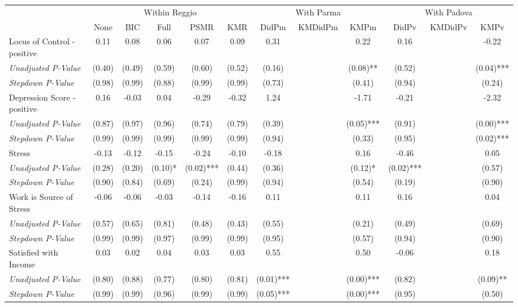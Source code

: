 \begin{tabular}{l c c c c c c c c c c c}
\toprule
& \multicolumn{5}{c}{Within Reggio} & \multicolumn{3}{c}{With Parma} & \multicolumn{3}{c}{With Padova} \\\cmidrule(lr){2-6} \cmidrule(lr){7-9} \cmidrule(lr){10-12}
 & None & BIC & Full & PSMR & KMR & DidPm & KMDidPm & KMPm & DidPv & KMDidPv & KMPv \\
\midrule
Locus of Control - positive & 0.11 & 0.08 & 0.06 & 0.07 & 0.09 & 0.31 & & 0.22 & 0.16 & & -0.22 \\
\quad \textit{Unadjusted P-Value} & (0.40) & (0.49) & (0.59) & (0.60) & (0.52) & (0.16) & & (0.08)** & (0.52) & & (0.04)*** \\
\quad \textit{Stepdown P-Value} & (0.98) & (0.99) & (0.88) & (0.99) & (0.99) & (0.73) & & (0.41) & (0.94) & & (0.24) \\
Depression Score - positive & 0.16 & -0.03 & 0.04 & -0.29 & -0.32 & 1.24 & & -1.71 & -0.21 & & -2.32 \\
\quad \textit{Unadjusted P-Value} & (0.87) & (0.97) & (0.96) & (0.74) & (0.79) & (0.39) & & (0.05)*** & (0.91) & & (0.00)*** \\
\quad \textit{Stepdown P-Value} & (0.99) & (0.99) & (0.99) & (0.99) & (0.99) & (0.94) & & (0.33) & (0.95) & & (0.02)*** \\
Stress & -0.13 & -0.12 & -0.15 & -0.24 & -0.10 & -0.18 & & 0.16 & -0.46 & & 0.05 \\
\quad \textit{Unadjusted P-Value} & (0.28) & (0.20) & (0.10)* & (0.02)*** & (0.44) & (0.36) & & (0.12)* & (0.02)*** & & (0.57) \\
\quad \textit{Stepdown P-Value} & (0.90) & (0.84) & (0.69) & (0.24) & (0.99) & (0.94) & & (0.54) & (0.19) & & (0.90) \\
Work is Source of Stress & -0.06 & -0.06 & -0.03 & -0.14 & -0.16 & 0.11 & & 0.11 & 0.16 & & 0.04 \\
\quad \textit{Unadjusted P-Value} & (0.57) & (0.65) & (0.81) & (0.48) & (0.43) & (0.55) & & (0.21) & (0.49) & & (0.69) \\
\quad \textit{Stepdown P-Value} & (0.99) & (0.99) & (0.97) & (0.99) & (0.99) & (0.95) & & (0.57) & (0.94) & & (0.90) \\
Satisfied with Income & 0.03 & 0.02 & 0.04 & 0.03 & 0.03 & 0.55 & & 0.50 & -0.06 & & 0.18 \\
\quad \textit{Unadjusted P-Value} & (0.80) & (0.88) & (0.77) & (0.80) & (0.81) & (0.01)*** & & (0.00)*** & (0.82) & & (0.09)** \\
\quad \textit{Stepdown P-Value} & (0.99) & (0.99) & (0.96) & (0.99) & (0.99) & (0.05)*** & & (0.00)*** & (0.95) & & (0.50) \\

\end{tabular}
